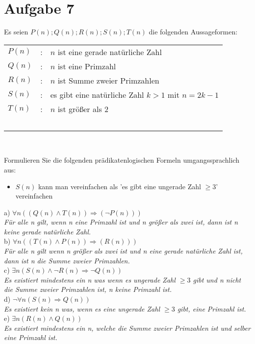 \section*{Aufgabe 7}

Es seien $P(n); Q(n); R(n); S(n); T(n)$ die folgenden Aussageformen:\\

\begin{tabular}{lcl}
$P(n)$ & : & $n$ ist eine gerade natürliche Zahl\\
$Q(n)$ & : & $n$ ist eine Primzahl\\
$R(n)$ & : & $n$ ist Summe zweier Primzahlen\\
$S(n)$ & : & es gibt eine natürliche Zahl $k > 1$ mit $n = 2k - 1$\\
$T(n)$ & : & $n$ ist größer als $2$\\~\\
\end{tabular}\

Formulieren Sie die folgenden prädikatenlogischen Formeln umgangssprachlich aus:

\begin{itemize}[leftmargin=*]
\item $S(n)$ kann man vereinfachen als 'es gibt eine ungerade Zahl $\geq 3$' vereinfachen
\end{itemize}

a) $\forall n ((Q(n) \land T(n)) \Rightarrow (\lnot P(n)))$\\

\textit{Für alle n gilt, wenn n eine Primzahl ist und n größer als zwei ist, dann ist n keine gerade natürliche Zahl.}\\

b) $\forall n ((T(n) \land P(n)) \Rightarrow (R(n)))$\\

\textit{Für alle n gilt wenn n größer als zwei ist und n eine gerade natürliche Zahl ist, dann ist n die Summe zweier Primzahlen.}\\

c) $\exists n (S(n) \land \lnot R(n) \Rightarrow \lnot Q(n))$\\

\textit{Es existiert mindestens ein n was wenn es ungerade Zahl $\geq 3$ gibt und n nicht die Summe zweier Primzahlen ist, n keine Primzahl ist.}\\

d) $\lnot \forall n (S(n) \Rightarrow Q(n))$\\

\textit{Es existiert kein n was, wenn es eine ungerade Zahl $\geq 3$ gibt, eine Primzahl ist.}\\

e) $\exists n (R(n) \land Q(n))$\\

\textit{Es existiert mindestens ein n, welche die Summe zweier Primzahlen ist und selber eine Primzahl ist.}